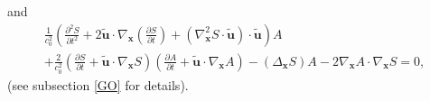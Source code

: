 \documentclass{article}
\theoremstyle{definition}
\theoremstyle{remark}
\renewcommand{\vec}[1]{\mathbf{#1}}
\begin{document}
and
\begin{multline}\label{MaxVacFullPPNmmmffffffiuiuhjuughbghhiuijghghghhhfhjjint}
\frac{1}{c^2_0}\left(\frac{\partial^2 S}{\partial t^2}+2\vec {\tilde
u}\cdot \nabla_{\vec x}\left(\frac{\partial S}{\partial
t}\right)+\left(\nabla^2_{\vec x}S\cdot\vec {\tilde
u}\right)\cdot\vec {\tilde
u}\right)A\\+\frac{2}{c^2_0}\left(\frac{\partial S}{\partial t}+\vec
{\tilde u}\cdot\nabla_{\vec x}S\right)\left(\frac{\partial
A}{\partial t}+\vec {\tilde u}\cdot\nabla_{\vec
x}A\right)-\left(\Delta_{\vec x}S\right)A-2\nabla_{\vec
x}A\cdot\nabla_{\vec x}S=0,
\end{multline}
(see subsection \ref{GO} for details).
\end{document}

